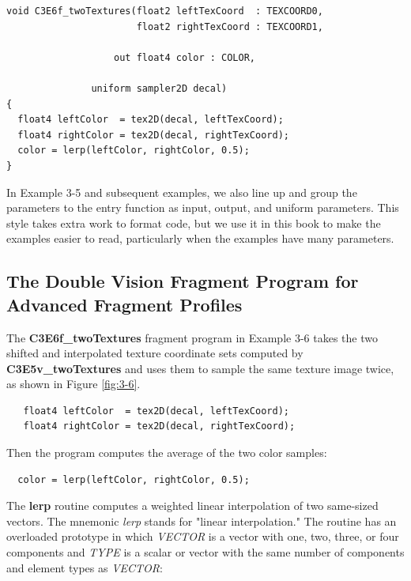 \documentclass{book}
\begin{document}
\FloatBarrier
\begin{lstlisting}[caption=Example 3-6. The \textbf{C3E6f_twoTextures} Fragment Program]
void C3E6f_twoTextures(float2 leftTexCoord  : TEXCOORD0,
                       float2 rightTexCoord : TEXCOORD1,

                   out float4 color : COLOR,

               uniform sampler2D decal)
{
  float4 leftColor  = tex2D(decal, leftTexCoord);
  float4 rightColor = tex2D(decal, rightTexCoord);
  color = lerp(leftColor, rightColor, 0.5);
}
\end{lstlisting}
\FloatBarrier

In Example 3-5 and subsequent examples, we also line up and group the parameters to the entry function as input, output, and uniform parameters. This style takes extra work to format code, but we use it in this book to make the examples easier to read, particularly when the examples have many parameters.

\subsection*{The Double Vision Fragment Program for Advanced Fragment Profiles}

The \textbf{C3E6f_twoTextures} fragment program in Example 3-6 takes the two shifted and interpolated texture coordinate sets computed by \textbf{C3E5v_twoTextures} and uses them to sample the same texture image twice, as shown in Figure \ref{fig:3-6}.

\FloatBarrier
\begin{lstlisting}   
   float4 leftColor  = tex2D(decal, leftTexCoord);
   float4 rightColor = tex2D(decal, rightTexCoord);
\end{lstlisting}
\FloatBarrier

Then the program computes the average of the two color samples:

\FloatBarrier
\begin{lstlisting}
  color = lerp(leftColor, rightColor, 0.5);
\end{lstlisting}
\FloatBarrier

The \textbf{lerp} routine computes a weighted linear interpolation of two same-sized vectors. The mnemonic \textit{lerp} stands for "linear interpolation." The routine has an overloaded prototype in which \textit{VECTOR} is a vector with one, two, three, or four components and \textit{TYPE} is a scalar or vector with the same number of components and element types as \textit{VECTOR}:
\end{document}
